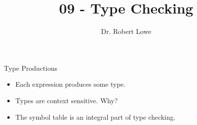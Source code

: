 \documentclass[]{beamer}
\title{09 - Type Checking}
\author{Dr. Robert Lowe\\}
\institute[Maryville College] %
{
  Division of Mathematics and Computer Science\\
  Maryville College
}
\date[]{}
\begin{document}
\begin{frame}
  \titlepage
\end{frame}





\begin{frame}{Type Productions}
    \begin{itemize}[<+->]
        \item Each expression produces some type.
        \item Types are context sensitive.  Why?
        \item The symbol table is an integral part of type checking.
    \end{itemize}
\end{frame}
\end{document}
